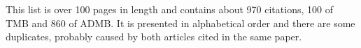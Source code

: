 \documentclass[12pt,letterpaper]{article}
\begin{document}
This list is over 100 pages in length and
contains about 970 citations, 100 of
TMB and 860 of ADMB. It is presented in alphabetical order and there
are some duplicates, probably caused by both articles cited in the
same paper. 

\nocite{*}

\clearpage\printbibliography[title=All AD Citations]
\clearpage\printbibliography[keyword=2019,title=Publication Year 2019]
\clearpage\printbibliography[keyword=2018,title=Publication Year 2018]
\clearpage\printbibliography[keyword=2017,title=Publication Year 2017]
\clearpage\printbibliography[keyword=2016,title=Publication Year 2016]
\clearpage\printbibliography[keyword=2015,title=Publication Year 2015]
\end{document}
